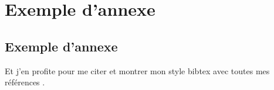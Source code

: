 
\chapter{Exemple d'annexe}
\label{chap:annexe1}

\section{Exemple d'annexe}

Et j'en profite pour me citer et montrer mon style bibtex avec toutes mes références \nocite{*}.